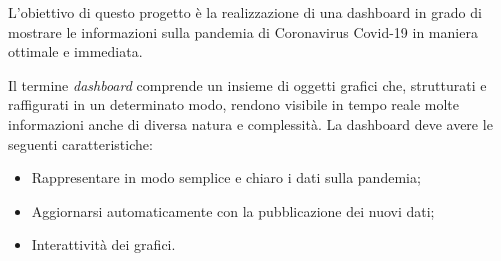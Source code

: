 
L’obiettivo di questo progetto è la realizzazione di una dashboard in grado di mostrare le informazioni sulla pandemia di Coronavirus Covid-19 in maniera ottimale e immediata.

Il termine \emph{dashboard} comprende un insieme di oggetti grafici che, strutturati e raffigurati in un determinato modo, rendono visibile in tempo reale molte informazioni anche di diversa natura e complessità. 
La dashboard deve avere le seguenti caratteristiche:
\begin{itemize}
    \item Rappresentare in modo semplice e chiaro i dati sulla pandemia;
    \item Aggiornarsi automaticamente con la pubblicazione dei nuovi dati;
    \item Interattività dei grafici.
\end{itemize}